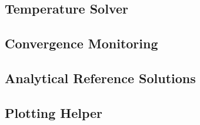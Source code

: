 \documentclass[12pt,a4paper]{article}
\begin{document}
\subsection{Temperature Solver}



\subsection{Convergence Monitoring}



\subsection{Analytical Reference Solutions}



\subsection{Plotting Helper}


\newpage
\end{document}
